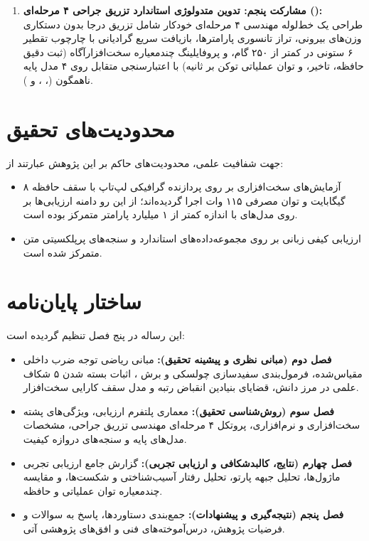 \documentclass[12pt,a4paper]{report}
\theoremstyle{definition}
\begin{document}
\begin{enumerate}
    \item \textbf{مشارکت پنجم: تدوین متدولوژی استاندارد تزریق جراحی ۴ مرحله‌ای ():} \\
    طراحی یک خط‌لوله مهندسی ۴ مرحله‌ای خودکار شامل تزریق درجا  بدون دستکاری وزن‌های بیرونی، تراز تانسوری پارامترها، بازیافت سریع گرادیانی با چارچوب تقطیر ۶ ستونی در کمتر از ۲۵۰ گام، و پروفایلینگ چندمعیاره سخت‌افزارآگاه (ثبت دقیق حافظه، تاخیر، و توان عملیاتی توکن بر ثانیه) با اعتبارسنجی متقابل روی ۴ مدل پایه ناهمگون (، ،  و ).
\end{enumerate}

\section{محدودیت‌های تحقیق}
جهت شفافیت علمی، محدودیت‌های حاکم بر این پژوهش عبارتند از:
\begin{itemize}
    \item آزمایش‌های سخت‌افزاری بر روی پردازنده گرافیکی لپ‌تاپ  با سقف حافظه ۸ گیگابایت  و توان مصرفی ۱۱۵ وات اجرا گردیده‌اند؛ از این رو دامنه ارزیابی‌ها بر روی مدل‌های با اندازه کمتر از ۱ میلیارد پارامتر متمرکز بوده است.
    \item ارزیابی کیفی زبانی بر روی مجموعه‌داده‌های استاندارد  و سنجه‌های پرپلکسیتی متن متمرکز شده است.
\end{itemize}

\section{ساختار پایان‌نامه}
این رساله در پنج فصل تنظیم گردیده است:
\begin{itemize}
    \item \textbf{فصل دوم (مبانی نظری و پیشینه تحقیق):} مبانی ریاضی توجه ضرب داخلی مقیاس‌شده، فرمول‌بندی سفیدسازی چولسکی و برش ، اثبات بسته شدن ۵ شکاف علمی در مرز دانش، قضایای بنیادین انقباض رتبه و مدل سقف کارایی سخت‌افزار.
    \item \textbf{فصل سوم (روش‌شناسی تحقیق):} معماری پلتفرم ارزیابی، ویژگی‌های پشته سخت‌افزاری و نرم‌افزاری، پروتکل ۴ مرحله‌ای مهندسی تزریق جراحی، مشخصات مدل‌های پایه و سنجه‌های دروازه کیفیت.
    \item \textbf{فصل چهارم (نتایج، کالبدشکافی و ارزیابی تجربی):} گزارش جامع ارزیابی تجربی ماژول‌ها، تحلیل جبهه پارتو، تحلیل رفتار آسیب‌شناختی و شکست‌ها، و مقایسه چندمعیاره توان عملیاتی و حافظه.
    \item \textbf{فصل پنجم (نتیجه‌گیری و پیشنهادات):} جمع‌بندی دستاوردها، پاسخ به سوالات و فرضیات پژوهش، درس‌آموخته‌های فنی و افق‌های پژوهشی آتی.
\end{itemize}
\end{document}
